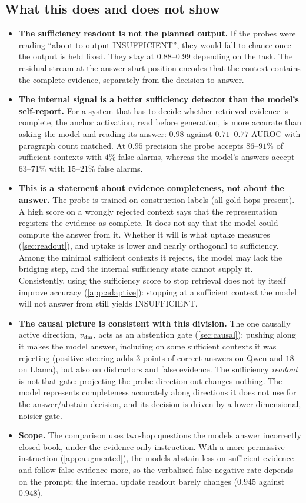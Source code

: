 \subsection{What this does and does not show}

\begin{itemize}
  \item \textbf{The sufficiency readout is not the planned output.} If the probes were reading ``about to output INSUFFICIENT'', they would fall to chance once the output is held fixed. They stay at $0.88$--$0.99$ depending on the task. The residual stream at the answer-start position encodes that the context contains the complete evidence, separately from the decision to answer.
  \item \textbf{The internal signal is a better sufficiency detector than the model's self-report.} For a system that has to decide whether retrieved evidence is complete, the anchor activation, read before generation, is more accurate than asking the model and reading its answer: $0.98$ against $0.71$--$0.77$ AUROC with paragraph count matched. At $0.95$ precision the probe accepts $86$--$91\%$ of sufficient contexts with $4\%$ false alarms, whereas the model's answers accept $63$--$71\%$ with $15$--$21\%$ false alarms.
  \item \textbf{This is a statement about evidence completeness, not about the answer.} The probe is trained on construction labels (all gold hops present). A high score on a wrongly rejected context says that the representation registers the evidence as complete. It does not say that the model could compute the answer from it. Whether it will is what uptake measures (\cref{sec:readout}), and uptake is lower and nearly orthogonal to sufficiency. Among the minimal sufficient contexts it rejects, the model may lack the bridging step, and the internal sufficiency state cannot supply it. Consistently, using the sufficiency score to stop retrieval does not by itself improve accuracy (\cref{app:adaptive}): stopping at a sufficient context the model will not answer from still yields INSUFFICIENT.
  \item \textbf{The causal picture is consistent with this division.} The one causally active direction, $v_{\mathrm{dm}}$, acts as an abstention gate (\cref{sec:causal}): pushing along it makes the model answer, including on some sufficient contexts it was rejecting (positive steering adds $3$ points of correct answers on Qwen and $18$ on Llama), but also on distractors and false evidence. The sufficiency \emph{readout} is not that gate: projecting the probe direction out changes nothing. The model represents completeness accurately along directions it does not use for the answer/abstain decision, and its decision is driven by a lower-dimensional, noisier gate.
  \item \textbf{Scope.} The comparison uses \musique{} two-hop questions the models answer incorrectly closed-book, under the evidence-only instruction. With a more permissive instruction (\cref{app:augmented}), the models abstain less on sufficient evidence and follow false evidence more, so the verbalised false-negative rate depends on the prompt; the internal update readout barely changes ($0.945$ against $0.948$).
\end{itemize}
